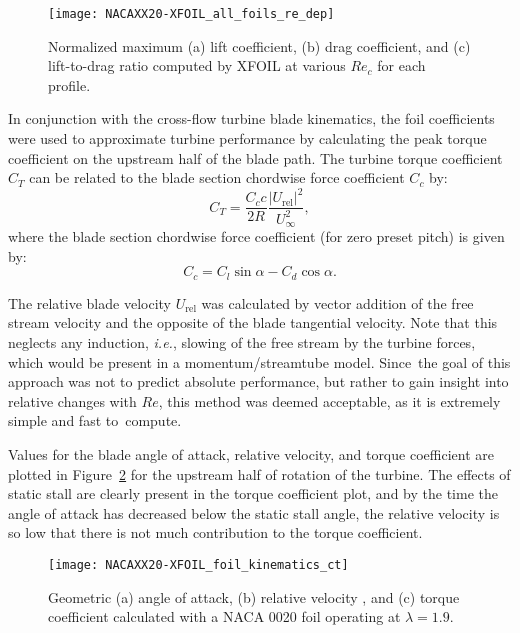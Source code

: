 \begin{figure}
    \centering
    
    \texttt{[image: NACAXX20-XFOIL\_all\_foils\_re\_dep]}
    
    \caption{Normalized maximum (a) lift coefficient, (b) drag coefficient, and
        (c) lift-to-drag ratio computed by XFOIL at various $Re_c$  for each
        profile.}
    
    \label{fig:foil-Re-dep}
\end{figure}

In conjunction with the cross-flow turbine blade kinematics, the foil
coefficients were used to approximate turbine performance by calculating the
peak torque coefficient on the upstream half of the blade path. The turbine
torque coefficient $C_T$ can be related to the blade section chordwise force
coefficient $C_c$ by:
\begin{equation}
    C_T = \frac{C_c c}{2R} \frac{|U_\mathrm{rel}|^2}{U_\infty^2},
    \label{eq:ct}
\end{equation}
where the blade section chordwise force coefficient (for zero preset pitch) is
given by:
\begin{equation}
    C_c = C_l \sin \alpha - C_d \cos \alpha.
    \label{eq:cc}
\end{equation}

The relative blade velocity $U_\mathrm{rel}$ was calculated by vector addition
of the free stream velocity and the opposite of the blade tangential velocity.
Note that this neglects any induction, \emph{i.e.}, slowing of the free stream
by the turbine forces, which would be present in a momentum/streamtube model.
Since~the goal of this approach was not to predict absolute performance, but
rather to gain insight into relative changes with $Re$, this method was deemed
acceptable, as it is extremely simple and fast to~compute.

Values for the blade angle of attack, relative velocity, and torque coefficient
are plotted in Figure~\ref{fig:blade-kinematics} for the upstream half of
rotation of the turbine. The effects of static stall are clearly present in the
torque coefficient plot, and by the time the angle of attack has decreased below
the static stall angle, the relative velocity is so low that there is not much
contribution to the torque coefficient.

\begin{figure}
    \centering
    
    \texttt{[image: NACAXX20-XFOIL\_foil\_kinematics\_ct]}
    
    \caption{Geometric (a) angle of attack, (b) relative velocity , and (c)
        torque coefficient calculated with a NACA 0020 foil operating at
        $\lambda=1.9$.}
    
    \label{fig:blade-kinematics}
\end{figure}


